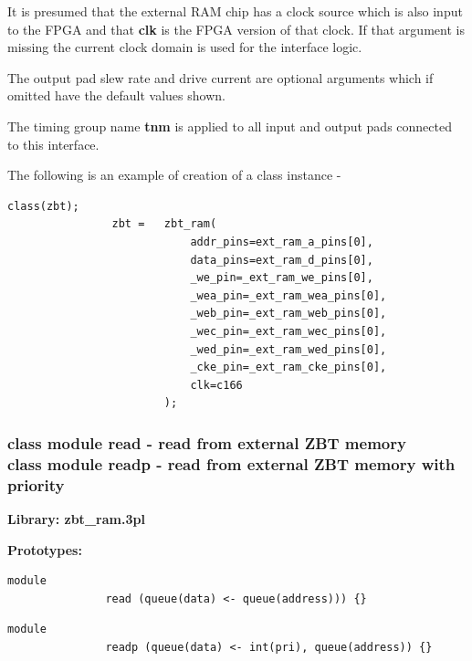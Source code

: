             It is presumed that the external RAM chip has a clock source
            which is also input to the FPGA and that {\bf clk} is the
            FPGA version of that clock. If that argument is missing the
            current clock domain is used for the interface logic.
            
            The output pad slew rate and drive current are optional arguments
            which if omitted have the default values shown.
            
            The timing group name {\bf tnm} is applied to all input and output pads
            connected to this interface.
            
 
            The following is an example of creation of a class instance - 
 
            \begin{lstlisting}[gobble=12, language=threepl]
                class(zbt);
                zbt =   zbt_ram(
                            addr_pins=ext_ram_a_pins[0],
                            data_pins=ext_ram_d_pins[0],
                            _we_pin=_ext_ram_we_pins[0],
                            _wea_pin=_ext_ram_wea_pins[0],
                            _web_pin=_ext_ram_web_pins[0],
                            _wec_pin=_ext_ram_wec_pins[0],
                            _wed_pin=_ext_ram_wed_pins[0],
                            _cke_pin=_ext_ram_cke_pins[0],
                            clk=c166
                        );
            \end{lstlisting}

 
            


        \subsubsection{class module read - read from external ZBT memory\\
                       class module readp - read from external ZBT memory with priority}\label{sec:lczbtramread}

            {\bf Library: zbt\_ram.3pl}

            {\bf Prototypes:} \\
            \vsp
            \begin{lstlisting}[gobble=12, language=threepl]
               module
               read (queue(data) <- queue(address))) {}
            \end{lstlisting}
            \begin{lstlisting}[gobble=12, language=threepl]
               module
               readp (queue(data) <- int(pri), queue(address)) {}
            \end{lstlisting}

